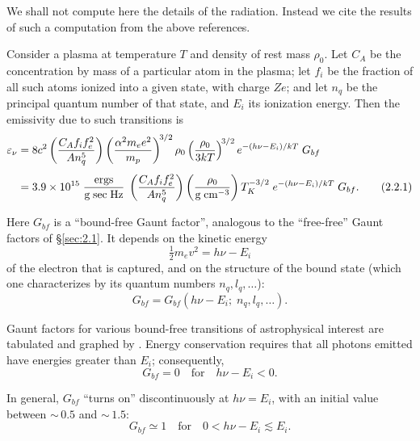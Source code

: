 We shall not compute here the details of the radiation.  Instead we cite the
results of such a computation from the above references.

Consider a plasma at temperature $T$ and density of rest mass $\rho_0$.  Let $C_A$ be
the concentration by mass of a particular atom in the plasma; let $f_i$ be the fraction
of all such atoms ionized into a given state, with charge $Ze$; and let $n_q$ be the
principal quantum number of that state, and $E_i$ its
ionization energy.  Then the emissivity due to such transitions is
\begin{align}
\varepsilon_\nu &= 8c^2
\left(\frac{C_A f_i f_e^2}{An_q^5}\right)
\left(\frac{\alpha^2 m_e e^2}{m_p}\right)^{\!3/2}
\rho_0
\left(\frac{\rho_0}{3kT}\right)^{\!3/2}
e^{-(h\nu - E_i)/kT}\;G_{bf}
\notag\\[4pt]
&= 3.9 \times 10^{15}\;
\frac{\text{ergs}}{\text{g\;sec\;Hz}}\;
\left(\frac{C_A f_i f_e^2}{An_q^5}\right)
\left(\frac{\rho_0}{\text{g\;cm}^{-3}}\right)
T_K^{-3/2}\;e^{-(h\nu - E_i)/kT}\;G_{bf}.
\tag{2.2.1}
\end{align}

Here $G_{bf}$ is a ``bound-free Gaunt factor'', analogous to the ``free-free'' Gaunt
factors of \S\ref{sec:2.1}.  It depends on the kinetic energy
\begin{equation}
\tfrac{1}{2}m_e v^2 = h\nu - E_i
\tag{2.2.2}
\end{equation}
of the electron that is captured, and on the structure of the bound state (which
one characterizes by its quantum numbers $n_q, l_q, \ldots$):
\begin{equation}
G_{bf} = G_{bf}(h\nu - E_i;\;n_q, l_q, \ldots).
\tag{2.2.3}
\end{equation}

Gaunt factors for various bound-free transitions of astrophysical interest are
tabulated and graphed by \citet{Karzas1961}.  Energy conservation
requires that all photons emitted have energies greater than $E_i$; consequently,
\begin{equation}
G_{bf} = 0 \quad \text{for} \quad h\nu - E_i < 0.
\tag{2.2.4}
\end{equation}

In general, $G_{bf}$ ``turns on'' discontinuously at $h\nu = E_i$, with an initial value
between ${\sim}\,0.5$ and ${\sim}\,1.5$:
\begin{equation}
G_{bf} \simeq 1 \quad \text{for} \quad 0 < h\nu - E_i \lesssim E_i.
\tag{2.2.5}
\end{equation}

